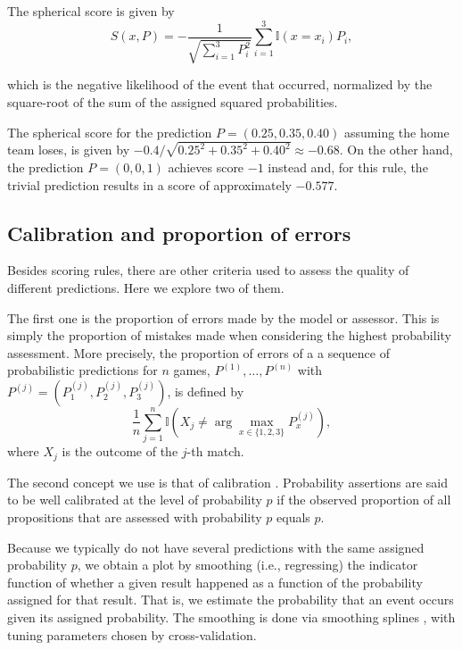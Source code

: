 \documentclass[journal,article,accept,moreauthors,pdftex,12pt,a4paper]{mdpi}
\begin{document}
	The spherical score is given by
	$$S(x,P)=- \frac{1}{\sqrt{\sum_{i=1}^3 P^2_i}}\sum_{i=1}^3\mathbb{I}(x=x_i)P_i,$$
	
	\noindent
	which is the negative likelihood of the event that occurred, normalized by the square-root of the sum of the assigned squared probabilities.
	
	The spherical score for the prediction
	$P=(0.25,0.35,0.40)$ assuming the home team loses, is given by
	$-0.4/\sqrt{0.25^2+0.35^2+0.40^2} \approx -0.68$.
	On the other hand, the prediction $P=(0,0,1)$ achieves score  $-1$ instead and, for this rule, the trivial prediction results in a score of approximately $-0.577$.
	
	\subsection{Calibration and proportion of errors}
	\label{sec::calib}
	
	Besides scoring rules, there are other criteria used to assess the quality of different predictions. Here we explore two of them.
	
	The first one is the proportion of errors made by the model or assessor. This is simply the proportion of mistakes made when considering the highest probability assessment.
	More precisely, the proportion of errors of a a sequence of probabilistic predictions for $n$ games, $P^{(1)},\ldots,P^{(n)}$
	with
	$P^{(j)}=(P^{(j)}_1,P^{(j)}_2,P^{(j)}_3)$, is defined by
	$$\frac{1}{n}\sum_{j=1}^n \mathbb{I}\left(X_j \neq \arg \max_{x \in \{1,2,3\}} P^{(j)}_x\right),$$
	where $X_j$ is the outcome of the $j$-th match.
	
	The second concept we use is that of calibration \cite{Dawid}. Probability assertions are said to be well calibrated at the level of probability $p$ if the observed proportion of all propositions that are assessed with probability $p$ equals $p$.
	
	Because we typically do not have several predictions with the same assigned probability $p$, we obtain a plot by smoothing (i.e., regressing) the indicator function of whether a given result happened as a function of the probability assigned for that result.
	That is, we estimate the probability that an event occurs given its assigned probability.
	The smoothing is done via smoothing splines \cite{wahba}, with tuning parameters chosen by cross-validation.
	
\end{document}
